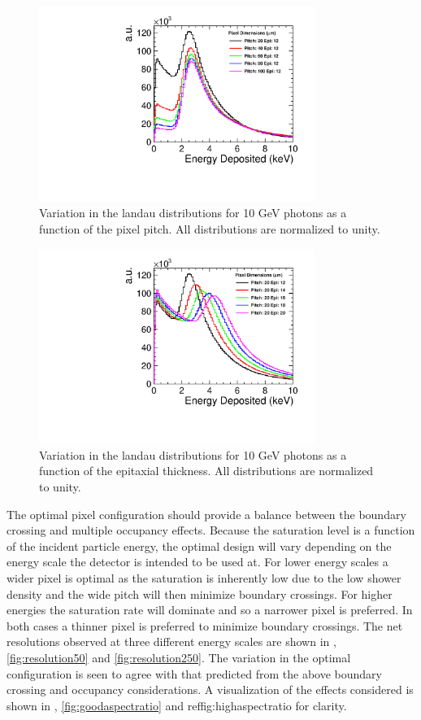 \begin{figure}
  \centering
  \includegraphics[width=0.8\textwidth,keepaspectratio]{DECALStudies/fig/LandauVsPitch.pdf}
  \caption{Variation in the landau distributions for 10 GeV photons as a function of the pixel pitch. All distributions are normalized to unity.}
  \label{fig:landaupitches}
\end{figure}
\begin{figure}
  \centering
  \includegraphics[width=0.8\textwidth,keepaspectratio]{DECALStudies/fig/LandauVsEpi.pdf}
  \caption{Variation in the landau distributions for 10 GeV photons as a function of the epitaxial thickness. All distributions are normalized to unity.}
  \label{fig:landauthickness}
\end{figure}

The optimal pixel configuration should provide a balance between the boundary crossing and multiple occupancy effects. Because the saturation level is a function of the incident particle energy, the optimal design will vary depending on the energy scale the detector is intended to be used at. For lower energy scales a wider pixel is optimal as the saturation is inherently low due to the low shower density and the wide pitch will then minimize boundary crossings. For higher energies the saturation rate will dominate and so a narrower pixel is preferred. In both cases a thinner pixel is preferred to minimize boundary crossings. The net resolutions observed at three different energy scales are shown in , \ref{fig:resolution50} and \ref{fig:resolution250}. The variation in the optimal configuration is seen to agree with that predicted from the above boundary crossing and occupancy considerations. A visualization of the effects considered is shown in , \ref{fig:goodaspectratio} and ref{fig:highaspectratio} for clarity.

